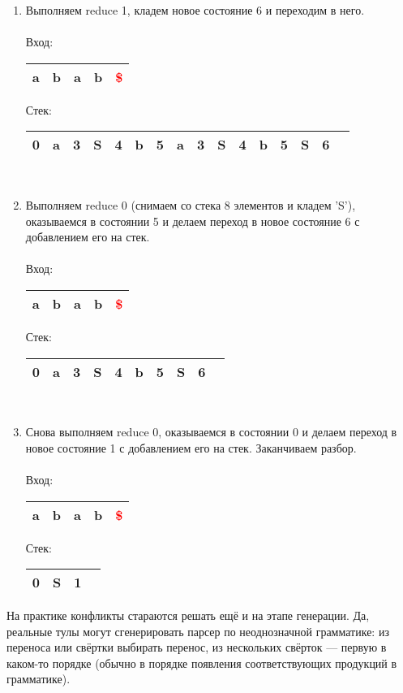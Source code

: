 \begin{example}
\begin{enumerate}
\item Выполняем reduce 1, кладем новое состояние 6 и переходим в него. \\ \\
Вход: \,
\begin{tabular}[c]{ |c|c|c|c|c| } 
    \hline a & b & a & b & \textcolor{red}{\$} \\ \hline
\end{tabular}
\qquad Стек: \,
\begin{tabular}[c]{ |c|c|c|c|c|c|c|c|c|c|c|c|c|c|c|c } 
    \hline 0 & a & 3 & S & 4 & b & 5 & a & 3 & S & 4 & b & 5 & S & 6 & \\ \hline
\end{tabular}
\\
\item Выполняем reduce 0 (снимаем со стека 8 элементов и кладем 'S'), оказываемся в состоянии 5 и делаем переход в новое состояние 6 с добавлением его на стек. \\ \\
Вход: \,
\begin{tabular}[c]{ |c|c|c|c|c| } 
    \hline a & b & a & b & \textcolor{red}{\$} \\ \hline
\end{tabular}
\qquad Стек: \,
\begin{tabular}[c]{ |c|c|c|c|c|c|c|c|c|c } 
    \hline 0 & a & 3 & S & 4 & b & 5 & S & 6 & \\ \hline
\end{tabular}
\\
\item Снова выполняем reduce 0, оказываемся в состоянии 0 и делаем переход в новое состояние 1 с добавлением его на стек. Заканчиваем разбор. \\ \\
Вход: \,
\begin{tabular}[c]{ |c|c|c|c|c| } 
    \hline a & b & a & b & \textcolor{red}{\$} \\ \hline
\end{tabular}
\qquad Стек: \,
\begin{tabular}[c]{ |c|c|c|c } 
    \hline 0 & S & 1 & \\ \hline
\end{tabular}
\end{enumerate}
\end{example}

На практике конфликты стараются решать ещё и на этапе генерации.
Да, реальные тулы могут сгенерировать парсер по неоднозначной грамматике: из переноса или свёртки выбирать перенос, из нескольких свёрток --- первую в каком-то порядке (обычно в порядке появления соответствующих продукций в грамматике).

